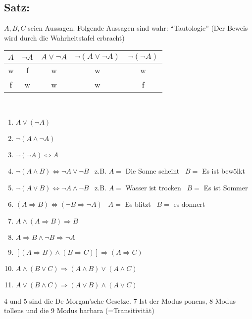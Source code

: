 \subsection{Satz:}
$A,B,C$ seien Aussagen. Folgende Aussagen sind wahr: "`Tautologie"' (Der Beweis wird durch die Wahrheitstafel erbracht)
\begin{center}
\begin{tabular}{cc||ccc}
$A$ & $\neg A$ & $A \vee \neg A$ & $\neg(A\vee \neg A)$ & $\neg(\neg A)$\\ \hline
w & f & w & w & w\\
f & w & w & w & f\\
\end{tabular}
\end{center}
\quad\\
\begin{enumerate}
\item $A\vee(\neg A)$
\item $\neg (A \wedge \neg A)$
\item $\neg (\neg A) \Leftrightarrow A$
\item $\neg (A \wedge B) \Leftrightarrow \neg A \vee \neg B$ \ z.B. $A=$ Die Sonne scheint \ $B=$ Es ist bewölkt
\item $\neg (A \vee B) \Leftrightarrow \neg A \wedge \neg B$ \ z.B. $A=$ Wasser ist trocken \ $B=$ Es ist Sommer
\item $(A\Rightarrow B) \Leftrightarrow (\neg B \Rightarrow \neg A)$ \ $A=$ Es blitzt \ $B=$ es donnert
\item $A \wedge (A \Rightarrow B) \Rightarrow B$
\item $A \Rightarrow B \wedge \neg B \Rightarrow \neg A$
\item $[(A\Rightarrow B) \wedge(B\Rightarrow C)]\Rightarrow(A\Rightarrow C)$
\item $A\wedge (B\vee C)\Rightarrow (A\wedge B)\vee(A\wedge C)$
\item $A \vee(B\wedge C) \Rightarrow (A\vee B) \wedge (A \vee C)$
\end{enumerate}
4 und 5 sind die De Morgan'sche Gesetze. 7 Ist der Modus ponens, 8 Modus tollens und die 9 Modus barbara (=Transitivität)\\
%
%
%
